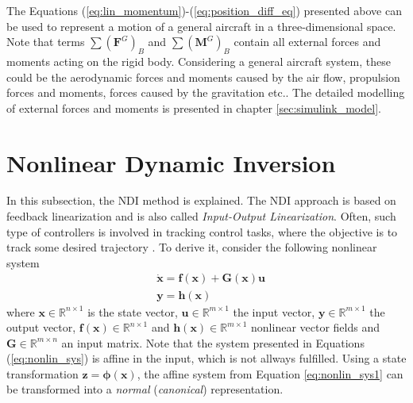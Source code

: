\documentclass[11pt, a4paper, twoside]{report}
\begin{document}
The Equations (\ref{eq:lin_momentum})-(\ref{eq:position_diff_eq}) presented above can be used to represent a motion of a general aircraft in a three-dimensional space. Note that terms $\sum(\bm{F}^G)_B$ and $\sum (\bm{M}^G)_B$ contain all external forces and moments acting on the rigid body. Considering a general aircraft system, these could be the aerodynamic forces and moments caused by the air flow, propulsion forces and moments, forces caused by the gravitation etc.. The detailed modelling of external forces and moments is presented in chapter \ref{sec:simulink_model}.

\section{Nonlinear Dynamic Inversion} \label{sec:ndi}

In this subsection, the \acrfull{NDI} method is explained. The \acrshort{NDI} approach is based on feedback linearization and is also called \textit{Input-Output Linearization}. Often, such type of controllers is involved in tracking control tasks, where the objective is to track some desired trajectory \cite{Slotine}. To derive it, consider the following nonlinear system
\begin{subequations}
	\begin{align}
		&\bm{\dot{x}} = \bm{f}(\bm{x}) + \bm{G}(\bm{x})\bm{u} \label{eq:nonlin_sys1} \\
		&\bm{y} = \bm{h}(\bm{x}) \label{eq:nonlin_sys2}
	\end{align}
	\label{eq:nonlin_sys}
\end{subequations}
\hspace{-5pt}where $\bm{x} \in \mathbb{R}^{n \times 1}$ is the state vector, $\bm{u} \in \mathbb{R}^{m \times 1}$ the input vector, $\bm{y} \in \mathbb{R}^{m \times 1}$ the output vector, $\bm{f}(\bm{x}) \in \mathbb{R}^{n \times 1}$ and $\bm{h}(\bm{x}) \in \mathbb{R}^{m \times 1}$ nonlinear vector fields and $\bm{G} \in \mathbb{R}^{m \times n}$ an input matrix. Note that the system presented in Equations (\ref{eq:nonlin_sys}) is affine in the input, which is not allways fulfilled. Using a state transformation $\bm{z} = \bm{\phi}(\bm{x})$, the affine system from Equation \ref{eq:nonlin_sys1} can be transformed into a \textit{normal} (\textit{canonical}) representation. 
\end{document}
